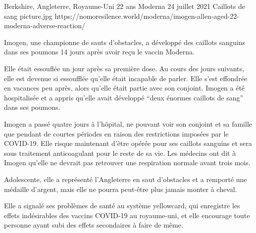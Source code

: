 {Berkshire, Angleterre, Royaume-Uni}
{22 ans}
{Moderna}
{24 juillet 2021}
{Caillots de sang}
{picture.jpg}
{https://nomoresilence.world/moderna/imogen-allen-aged-22-moderna-adverse-reaction/}
{

Imogen, une championne de sauts d'obstacles, a développé des caillots sanguins
dans ses poumons 14 jours après avoir reçu le vaccin Moderna.

Elle était essouflée un jour après sa première dose. Au cours des jours
suivants, elle est devenue si essoufflée qu'elle était incapable de parler. Elle
s'est effondrée en vacances peu après, alors qu'elle était partie avec son
conjoint. Imogen a été hospitalisée et a appris qu'elle avait développé “deux
énormes caillots de sang” dans ses poumons.

Imogen a passé quatre jours à l'hôpital, ne pouvant voir son conjoint et sa
famille que pendant de courtes périodes en raison des restrictions imposées par
le COVID-19. Elle risque maintenant d'être opérée pour ses caillots sanguins et
sera sous traitement anticoagulant pour le reste de sa vie. Les médecins ont dit
à Imogen qu'elle ne devrait pas retrouver une respiration normale avant trois
mois.

Adolescente, elle a représenté l'Angleterre en saut d'obstacles et a remporté
une médaille d'argent, mais elle ne pourra peut-être plus jamais monter à
cheval.

Elle a signalé ses problèmes de santé au système yellowcard, qui enregistre les
effets indésirables des vaccins COVID-19 au royaume-uni, et elle encourage toute
personne ayant subi des effets secondaires à faire de même.

}

